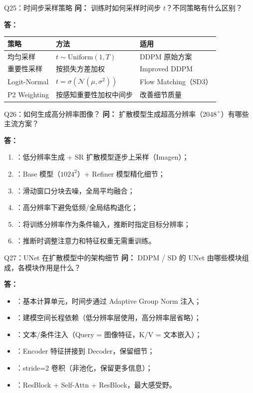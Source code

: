 \begin{conceptbox}{Q25：时间步采样策略}
\textbf{问：} 训练时如何采样时间步 $t$？不同策略有什么区别？

\textbf{答：}
\begin{center}
\begin{tabular}{lll}
\hline
\textbf{策略} & \textbf{方法} & \textbf{适用} \\ \hline
均匀采样 & $t\sim\text{Uniform}(1,T)$ & DDPM 原始方案 \\
重要性采样 & 按损失方差加权 & Improved DDPM \\
Logit-Normal & $t = \sigma(\mathcal{N}(\mu,\sigma^2))$ & Flow Matching（SD3）\\
P2 Weighting & 按感知重要性加权中间步 & 改善细节质量 \\
\hline
\end{tabular}
\end{center}
\end{conceptbox}

\begin{conceptbox}{Q26：如何生成高分辨率图像？}
\textbf{问：} 扩散模型生成超高分辨率（$2048^+$）有哪些主流方案？

\textbf{答：}
\begin{enumerate}
  \item {}：低分辨率生成 + SR 扩散模型逐步上采样（Imagen）；
  \item {}：Base 模型（$1024^2$）+ Refiner 模型精化细节；
  \item {}：滑动窗口分块去噪，全局平均融合；
  \item {}：高分辨率下避免低频/全局结构退化；
  \item {}：将训练分辨率作为条件输入，推断时指定目标分辨率；
  \item {}：推断时调整注意力和特征权重无需重训练。
\end{enumerate}
\end{conceptbox}

\begin{conceptbox}{Q27：UNet 在扩散模型中的架构细节}
\textbf{问：} DDPM / SD 的 UNet 由哪些模块组成，各模块作用是什么？

\textbf{答：}
\begin{itemize}
  \item {}：基本计算单元，时间步通过 Adaptive Group Norm 注入；
  \item {}：建模空间长程依赖（低分辨率层使用，高分辨率层省略）；
  \item {}：文本/条件注入（Query = 图像特征，K/V = 文本嵌入）；
  \item {}：Encoder 特征拼接到 Decoder，保留细节；
  \item {}：stride=2 卷积（非池化，保留更多信息）；
  \item {}：ResBlock + Self-Attn + ResBlock，最大感受野。
\end{itemize}
\end{conceptbox}


